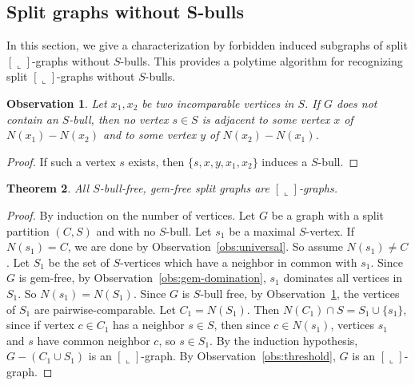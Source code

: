 \documentclass[11pt,3p,times]{elsarticle}
\newenvironment{myproof}{\begin{proof}}{\end{proof}}
\newcommand{\La}{\ensuremath{\llcorner}} \newcommand{\Lb}{\ensuremath{\ulcorner}} \newcommand{\Lc}{\ensuremath{\lrcorner}} \newcommand{\Ld}{\ensuremath{\urcorner}}
\newtheorem{theorem}{Theorem}
\newtheorem{observation}[theorem]{Observation}
\begin{document}
\subsection{Split graphs without S-bulls}
In this section, we give a characterization by forbidden induced
subgraphs of split $[\La]$-graphs without $S$-bulls. This provides
a polytime algorithm for recognizing split $[\La]$-graphs without
$S$-bulls.
\begin{observation}\label{obs:bull}
Let $x_1, x_2$ be two incomparable vertices in $S$. If $G$ does
not contain an $S$-bull, then no vertex $s \in S$ is adjacent to
some vertex $x$ of $N(x_1) - N(x_2)$ and to some vertex $y$ of
$N(x_2) - N(x_1)$.
\end{observation}
\begin{myproof}
If such a vertex $s$ exists, then $\{s, x, y,
x_1, x_2\}$ induces a $S$-bull.
\end{myproof}
\begin{theorem}\label{thm:S-bull-gem-free}
All $S$-bull-free, gem-free split graphs are $[\La]$-graphs.
\end{theorem}
\begin{myproof}
By induction on the number of vertices. Let $G$ be a graph with a
split partition $(C,S)$ and with no $S$-bull. Let $s_1$ be a maximal $S$-vertex.
If $N(s_1) = C$, we are done by Observation~\ref{obs:universal}. So
assume $N(s_1) \neq C$. Let $S_1$ be the set of $S$-vertices which have a neighbor
in common with $s_1$. Since $G$ is gem-free, by Observation~\ref{obs:gem-domination},
$s_1$ dominates all vertices in $S_1$. So $N(s_1) = N(S_1)$. Since $G$ is $S$-bull
free, by Observation~\ref{obs:bull}, the vertices of $S_1$ are pairwise-comparable.
Let $C_1 = N(S_1)$. Then $N(C_1) \cap S = S_1 \cup \{s_1\}$, since if vertex $c \in C_1$
has a neighbor $s \in S$, then since $c \in N(s_1)$, vertices $s_1$ and $s$ have
common neighbor $c$, so $s \in S_1$. By the induction hypothesis,
$G-(C_1 \cup S_1)$ is an $[\La]$-graph.  By Observation~\ref{obs:threshold}, $G$
is an $[\La]$-graph.
\end{myproof}
\end{document}
